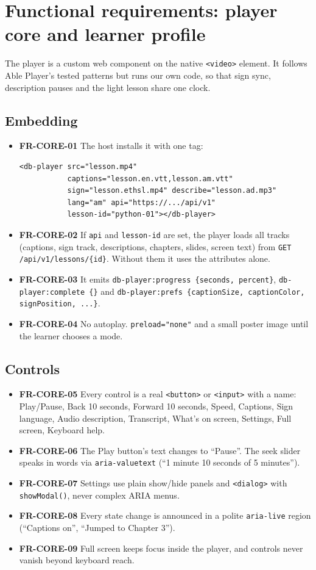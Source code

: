 \documentclass[11pt,a4paper]{article}
\newcommand{\code}[1]{\texttt{#1}}
\newcommand{\req}[1]{\textbf{#1}}
\begin{document}
\section{Functional requirements: player core and learner profile}

The player is a custom web component on the native \code{<video>} element. It follows Able Player's tested patterns but runs our own code, so that sign sync, description pauses and the light lesson share one clock.

\subsection{Embedding}
\begin{itemize}
  \item \req{FR-CORE-01} The host installs it with one tag:
\begin{verbatim}
<db-player src="lesson.mp4"
           captions="lesson.en.vtt,lesson.am.vtt"
           sign="lesson.ethsl.mp4" describe="lesson.ad.mp3"
           lang="am" api="https://.../api/v1"
           lesson-id="python-01"></db-player>
\end{verbatim}
  \item \req{FR-CORE-02} If \code{api} and \code{lesson-id} are set, the player loads all tracks (captions, sign track, descriptions, chapters, slides, screen text) from \code{GET /api/v1/lessons/\{id\}}. Without them it uses the attributes alone.
  \item \req{FR-CORE-03} It emits \code{db-player:progress \{seconds, percent\}}, \code{db-player:complete \{\}} and \code{db-player:prefs \{captionSize, captionColor, signPosition, ...\}}.
  \item \req{FR-CORE-04} No autoplay. \code{preload="none"} and a small poster image until the learner chooses a mode.
\end{itemize}

\subsection{Controls}
\begin{itemize}
  \item \req{FR-CORE-05} Every control is a real \code{<button>} or \code{<input>} with a name: Play/Pause, Back 10 seconds, Forward 10 seconds, Speed, Captions, Sign language, Audio description, Transcript, What's on screen, Settings, Full screen, Keyboard help.
  \item \req{FR-CORE-06} The Play button's text changes to ``Pause''. The seek slider speaks in words via \code{aria-valuetext} (``1 minute 10 seconds of 5 minutes'').
  \item \req{FR-CORE-07} Settings use plain show/hide panels and \code{<dialog>} with \code{showModal()}, never complex ARIA menus.
  \item \req{FR-CORE-08} Every state change is announced in a polite \code{aria-live} region (``Captions on'', ``Jumped to Chapter 3'').
  \item \req{FR-CORE-09} Full screen keeps focus inside the player, and controls never vanish beyond keyboard reach.
\end{itemize}
\end{document}
